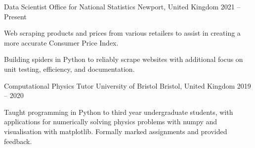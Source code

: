 
\begin{cventries}

    \cventry
        {Data Scientist} %
        {Office for National Statistics} %
        {Newport, United Kingdom} %
        {2021 -- Present} %
        {
            \begin{cvitems} %
                \item{Web scraping products and prices from various retailers to assist in creating a more accurate Consumer Price Index.}
                \item{Building spiders in Python to reliably scrape websites with additional focus on unit testing, efficiency, and documentation.}
            \end{cvitems}
        }

    \cventry
        {Computational Physics Tutor} %
        {University of Bristol} %
        {Bristol, United Kingdom} %
        {2019 -- 2020} %
        {
            \begin{cvitems} %
                \item{Taught programming in Python to third year undergraduate students, with applications for numerically solving physics problems with numpy and visualisation with matplotlib. Formally marked assignments and provided feedback.}
            \end{cvitems}
        }


\end{cventries}
